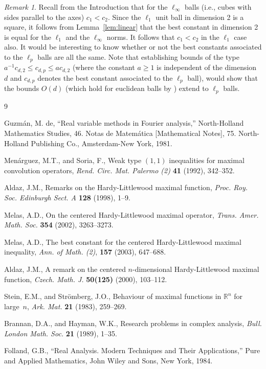 \documentclass[12pt,a4paper]{amsart}
\theoremstyle{plain}
\theoremstyle{remark}
\newtheorem{rem}{Remark}
\begin{document}
\begin{rem}
Recall from the Introduction that for the
$\ell_\infty$ balls (i.e., cubes with sides parallel to the axes)
$c_1 < c_2.$
Since the $\ell_1$ unit ball in dimension 2 is a square, it
follows from Lemma~\ref{lem:linear} that the best constant in dimension 2
is equal for the $\ell_1$ and the $\ell_\infty$ norms. It follows that
$c_1 < c_2$ in the $\ell_1$ case also. It would
be interesting to know whether or not the best constants associated
to the $\ell_p$ balls are all the same.
Note that  establishing bounds of the type
$a^{-1} c_{d,2} \le c_{d,p} \le a c_{d,2}$ (where the constant
$a \ge 1$ is independent of the dimension $d$ and $c_{d,p}$
denotes the best constant associated to the $\ell_p$ ball),
would show that the bounds
$O(d)$ (which hold for euclidean balls by
\cite{StSt}) extend to $\ell_p$ balls.
\end{rem}



\begin{thebibliography}{9}

\frenchspacing

Guzm\'an, M. de, %
``Real variable methods in Fourier analysis,''
North-Holland Mathematics
Studies, 46. Notas de Matem\'atica [Mathematical Notes], 75.
North-Holland Publishing Co., Amsterdam-New York, 1981.

Men\'arguez, M.T., and Soria, F.,
Weak type $(1,1)$ inequalities for maximal convolution operators,
\textit{Rend. Circ. Mat. Palermo (2)}
\textbf{41}
(1992),
342--352.

Aldaz, J.M.,
Remarks on the Hardy-Littlewood maximal function,
\textit{Proc. Roy. Soc. Edinburgh Sect. A}
\textbf{128}
(1998),
1--9.

Melas, A.D., %
On the centered Hardy-Littlewood
maximal operator,
\textit{Trans. Amer. Math. Soc.}
\textbf{354} (2002),
3263--3273.

Melas, A.D., %
The best constant for the centered Hardy-Littlewood
maximal inequality,
\textit{Ann. of Math. (2)},
\textbf{157} (2003),
647--688. 

Aldaz, J.M.,
A remark on the centered $n$-dimensional Hardy-Littlewood maximal
function,
\textit{Czech. Math. J.}
\textbf{50(125)} (2000),
103--112.

Stein, E.M., and Str\"omberg, J.O.,
Behaviour of maximal functions in $\mathbb{R}^n$ for large~$n$,
\textit{Ark. Mat.}
\textbf{21}
(1983),
259--269.

Brannan, D.A., and Hayman, W.K.,
Research problems in complex analysis,
\textit{Bull. London Math. Soc.}
\textbf{21}
(1989),
1--35.

Folland, G.B., %
``Real Analysis. Modern Techniques and Their Applications,''
Pure and Applied Mathematics,
John Wiley and Sons, New York,
1984.

\end{thebibliography}
\end{document}
